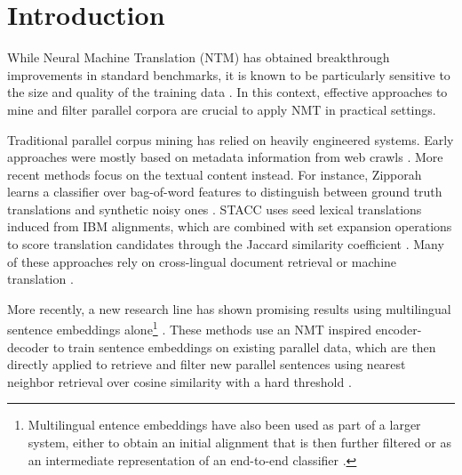 \documentclass[11pt,a4paper]{article}
\begin{document}
\newcommand{\InsertFigArchi}{
\begin{figure*}[t] \centering
\texttt{[image: fig/architecture.pdf]}
\caption{Architecture of our system to learn multilingual sentence embeddings.}
\label{fig:architecture}
\end{figure*}
}

\section{Introduction}
\label{sec:introduction}



While Neural Machine Translation (NTM) has obtained breakthrough improvements in standard benchmarks, it is known to be particularly sensitive to the size and quality of the training data \citep{koehn2017six,khayrallah2018impact}. In this context, effective approaches to mine and filter parallel corpora are crucial to apply NMT in practical settings.

Traditional parallel corpus mining has relied on heavily engineered systems. Early approaches were mostly based on metadata information from web crawls \citep{resnik1999mining,shi2006dom}. More recent methods focus on the textual content instead. For instance, Zipporah learns a classifier over bag-of-word features to distinguish between ground truth translations and synthetic noisy ones \citep{xu2017zipporah}. STACC uses seed \mbox{lexical} translations induced from IBM alignments, which are combined with set expansion operations to score translation candidates through the Jaccard similarity coefficient \citep{etchegoyhen2016set,azpeitia2017weighted,azpeitia2018extracting}. Many of these approaches rely on cross-lingual document retrieval \citep{utiyama2003reliable,munteanu2005improving,munteanu2006extracting,rauf2009comparable} or machine translation \citep{rauf2009comparable,bouamor2018h2}.

More recently, a new research line has shown promising results using multilingual sentence embeddings alone\footnote{Multilingual entence embeddings have also been used as part of a larger system, either to obtain an initial alignment that is then further filtered \citep{bouamor2018h2} or as an intermediate representation of an end-to-end classifier \citep{gregoire2017bucc}.} \citep{schwenk2018filtering,guo:2018:wmt_effective}.
These methods use an NMT inspired encoder-decoder to train sentence embeddings on existing parallel data, which are then directly applied to retrieve and filter new parallel sentences using nearest neighbor retrieval over cosine similarity with a hard threshold \citep{espana2017empirical,hassan2018achieving,schwenk2018filtering}.
\end{document}
